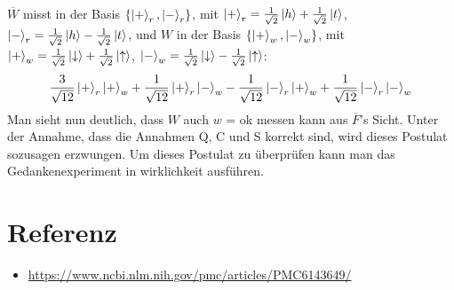 \documentclass[a4paper]{article}
\begin{document}
$\overline{W}$ misst in der Basis $\qty{\ket{+}_{r}, \ket{-}_{r}}$,
mit $\ket{+}_{r} = \frac{1}{\sqrt{2}} \ket{h} + \frac{1}{\sqrt{2}} \ket{t}$, $\ket{-}_{r} = \frac{1}{\sqrt{2}} \ket{h} - \frac{1}{\sqrt{2}} \ket{t}$,
und $W$ in der Basis $\qty{\ket{+}_{w}, \ket{-}_{w}}$,
mit $\ket{+}_{w} = \frac{1}{\sqrt{2}} \ket{\downarrow} + \frac{1}{\sqrt{2}} \ket{\uparrow}$, $\ket{-}_{w} = \frac{1}{\sqrt{2}} \ket{\downarrow} - \frac{1}{\sqrt{2}} \ket{\uparrow}$:
\begin{align*}
\frac{3}{\sqrt{12}}\ket{+}_{r}\ket{+}_{w} + \frac{1}{\sqrt{12}}\ket{+}_{r}\ket{-}_{w} - \frac{1}{\sqrt{12}}\ket{-}_{r}\ket{+}_{w} + \frac{1}{\sqrt{12}}\ket{-}_{r}\ket{-}_{w}
\end{align*}
Man sieht nun deutlich, dass $W$ auch $w$ = ok messen kann aus $\overline{F}$'s Sicht.
Unter der Annahme, dass die Annahmen Q, C und S korrekt sind, wird dieses Postulat sozusagen erzwungen.
Um dieses Postulat zu überprüfen kann man das Gedankenexperiment in wirklichkeit ausführen.

\section*{Referenz}
\begin{itemize}
	\item \url{https://www.ncbi.nlm.nih.gov/pmc/articles/PMC6143649/}
\end{itemize}
\end{document}
